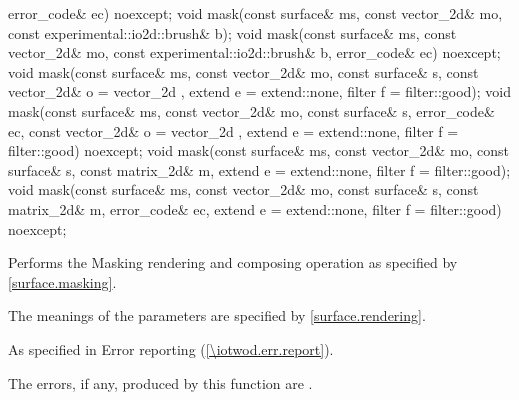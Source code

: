 \begin{itemdecl}
  error_code& ec) noexcept;
void mask(const surface& ms, const vector_2d& mo,
  const experimental::io2d::brush& b);
void mask(const surface& ms, const vector_2d& mo,
  const experimental::io2d::brush& b, error_code& ec) noexcept;
void mask(const surface& ms, const vector_2d& mo, const surface& s,
  const vector_2d& o = vector_2d{ }, extend e = extend::none,
  filter f = filter::good);
void mask(const surface& ms, const vector_2d& mo, const surface& s,
  error_code& ec, const vector_2d& o = vector_2d{ },
  extend e = extend::none, filter f = filter::good) noexcept;
void mask(const surface& ms, const vector_2d& mo, const surface& s,
  const matrix_2d& m, extend e = extend::none, filter f = filter::good);
void mask(const surface& ms, const vector_2d& mo, const surface& s,
  const matrix_2d& m, error_code& ec, extend e = extend::none,
  filter f = filter::good) noexcept;
\end{itemdecl}
\begin{itemdescr}
\pnum
\effects
Performs the Masking rendering and composing operation as specified by \ref{surface.masking}.

\pnum
The meanings of the parameters are specified by \ref{surface.rendering}.

\pnum
\throws
As specified in Error reporting (\ref{\iotwod.err.report}).

\pnum
\errors
The errors, if any, produced by this function are .
\end{itemdescr}

